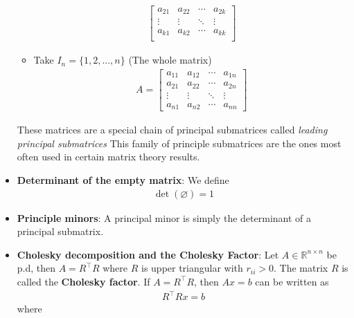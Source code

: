 \documentclass{report}
\begin{document}
\begin{itemize}
\begin{itemize}
\begin{align*}
\begin{bmatrix}
                            a_{21} & a_{22} & \cdots & a_{2k} \\
                            \vdots & \vdots & \ddots & \vdots \\
                            a_{k1} & a_{k2} & \cdots & a_{kk} \\
                        \end{bmatrix}
                    \end{align*}
                \item Take $I_{n} = \{1,2,...,n\} $ (The whole matrix)
                    \begin{align*}
                        A = \begin{bmatrix}
                            a_{11} & a_{12} & \cdots & a_{1n} \\
                            a_{21} & a_{22} & \cdots & a_{2n} \\
                            \vdots & \vdots & \ddots & \vdots \\
                            a_{n1} & a_{n2} & \cdots & a_{nn} 
                        \end{bmatrix}
                    \end{align*}
            \end{itemize}
            \bigbreak \noindent 
            These matrices are a special chain of principal submatrices called \textit{leading principal submatrices}
            \bigbreak \noindent 
            This family of principle submatrices are the ones most often used in certain matrix theory results.
        \item \textbf{Determinant of the empty matrix}: We define
            \begin{align*}
                \det(\varnothing) = 1
            \end{align*}
        \item \textbf{Principle minors}: A principal minor is simply the determinant of a principal submatrix.
        \item \textbf{Cholesky decomposition and the Cholesky Factor}: Let $A \in \mathbb{R}^{n\times n}$ be p.d, then $A = R^{\top}R$ where $R$ is upper triangular with $r_{ii} > 0$. The matrix $R$ is called the \textbf{Cholesky factor}.
            \bigbreak \noindent 
            If $A = R^{\top}R$, then $Ax = b$ can be written as 
            \begin{align*}
                R^{\top}Rx = b
            \end{align*}
            where

\end{itemize}
\end{document}
